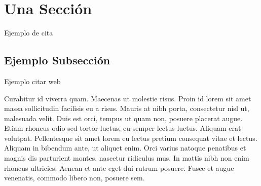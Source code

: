\section{Una Sección}

Ejemplo de cita\cite{turing1936a}

\subsection{Ejemplo Subsección}

Ejemplo citar web\cite{famaf-cover}

Curabitur id viverra quam. Maecenas ut molestie risus. Proin id lorem sit amet massa sollicitudin facilisis eu a risus. Mauris at nibh porta, consectetur nisl ut, malesuada velit. Duis est orci, tempus ut quam non, posuere placerat augue. Etiam rhoncus odio sed tortor luctus, eu semper lectus luctus. Aliquam erat volutpat. Pellentesque sit amet lorem eu lectus pretium consequat vitae et lectus. Aliquam in bibendum ante, ut aliquet enim. Orci varius natoque penatibus et magnis dis parturient montes, nascetur ridiculus mus. In mattis nibh non enim rhoncus ultricies. Aenean et ante eget dui rutrum posuere. Fusce et augue venenatis, commodo libero non, posuere sem.

